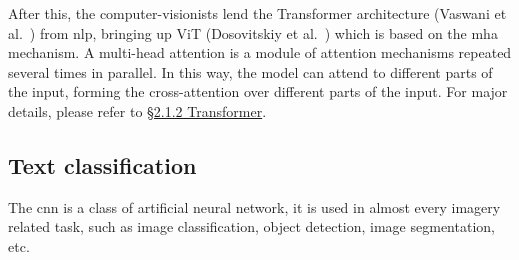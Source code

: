 After this, the computer-visionists lend the Transformer architecture (Vaswani et al.~\cite{transformer_paper}) from \gls{nlp}, bringing up ViT (Dosovitskiy et al.~\cite{vit_paper}) which is based on the \gls{mha} mechanism.
A multi-head attention is a module of attention mechanisms repeated several times in parallel.
In this way, the model can attend to different parts of the input, forming the cross-attention over different parts of the input.
For major details, please refer to \hyperref[subsec:transformer]{\S2.1.2 Transformer}.

\subsection{Text classification}\label{subsec:text-classification}
The \gls{cnn} is a class of artificial neural network, it is used in almost every imagery related task, such as image classification, object detection, image segmentation, etc.

